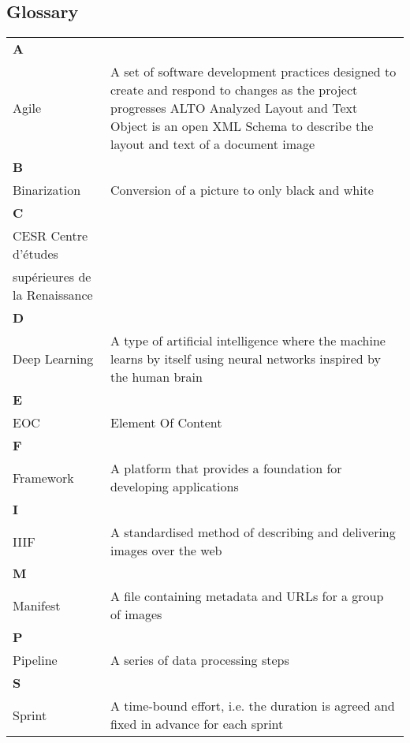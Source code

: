 \documentclass{polytech/polytech}
\numberwithin{figure}{chapter}
\begin{document}
\begin{appendix}
\chapter{Glossary}
\begin{table}[]

\begin{tabular}{ll}
\textbf{A}	& \\
Agile	& A set of software development practices designed to create and respond to changes as the project progresses
ALTO	Analyzed Layout and Text Object is an open XML Schema to describe the layout and text of a document image\\
	
\textbf{B}	& \\
Binarization	& Conversion of a picture to only black and white\\
	
\textbf{C}	& \\
CESR	Centre d’études \\supérieures de la Renaissance\\
	
\textbf{D}	& \\
Deep Learning	& A type of artificial intelligence where the machine learns by itself using neural networks inspired by the human brain\\
	
\textbf{E}	& \\
EOC	& Element Of Content\\
	
\textbf{F}	& \\
Framework	& A platform that provides a foundation for developing applications\\
	
\textbf{I}	& \\
IIIF	& A standardised method of describing and delivering images over the web\\
	
\textbf{M}	& \\
Manifest	& A file containing metadata and URLs for a group of images\\
	
\textbf{P}	& \\
Pipeline	& A series of data processing steps\\
	
\textbf{S}	& \\
Sprint	& A time-bound effort, i.e. the duration is agreed and fixed in advance for each sprint\\
\end{tabular}
\end{table}




\end{appendix}
\end{document}
